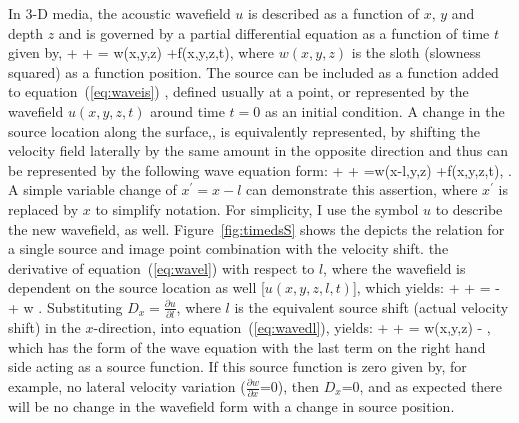  In 3-D media, the acoustic wavefield $u$ is described as a function of $x$, $y$ and depth $z$ and is governed by a partial differential 
 equation as a function of time $t$ given by,
\beqa
{}+
 +  = w(x,y,z)  +f(x,y,z,t),
\label{eq:waveis}
\eeqa
where $w(x,y,z)$ is the sloth (slowness squared) as a function position.  The source can be included as a function added to equation~(\ref{eq:waveis}) ,  defined usually at a point, or represented by the 
wavefield $u(x,y,z,t)$ around time $t=0$ as an initial condition. 
A change in the source location along the surface,, is equivalently represented, 
 by shifting the velocity field laterally
by the same amount in the opposite direction and thus can be represented by the following wave equation form:
\beqa
{}+
 + =w(x-l,y,z) +f(x,y,z,t),
\label{eq:wavel}
\eeqa
 . A simple variable change of $x^{'}=x-l$ can demonstrate this assertion, where $x^{'}$ is replaced by $x$ to
 simplify notation. For simplicity, I use the symbol $u$ to describe the new wavefield, as well. 
 Figure~\ref{fig:timedsS} shows the depicts the relation for a single source and image point combination with the velocity shift.
 the derivative of equation~(\ref{eq:wavel}) with respect to $l$, where the wavefield is
dependent on the source location as well [$u(x,y,z,l,t)$], which yields:
\beqa
{}+
 +  = 
-  + w .
\label{eq:wavedl}
\eeqa
Substituting $D_x=\frac{\partial u}{\partial l}$, where $l$ is the equivalent source shift (actual velocity shift) 
in the $x$-direction, into equation~(\ref{eq:wavedl}),   yields:
\beqa
{}+
 +  = 
w(x,y,z)  -  ,
\label{eq:wavedlF}
\eeqa
which has the form of the wave equation with the last term on the right hand side acting as a source function. If this source function is zero given by, for example,
 no lateral
velocity variation ($\frac{\partial w}{\partial x}$=0), then $D_x$=0, and as expected there will be no change in the wavefield form 
with a change in source position.


